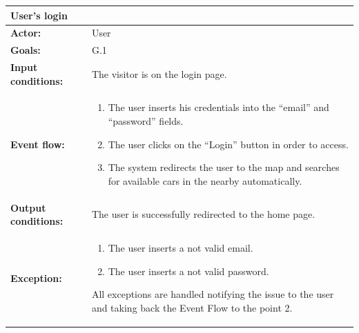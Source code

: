 \begin{tabular} { p{5cm} p{8cm} } 
\textbf{User's login} & \\
\hline
\textbf{Actor:} & User \\ 
\textbf{Goals:} & G.1 \\ 
\textbf{Input conditions:} & The visitor is on the login page. \\
\textbf{Event flow:} & \begin{enumerate}
				\item
				The user inserts his credentials into the “email” and “password” fields.
				\item
				The user clicks on the “Login” button in order to access.
				\item
				The system redirects the user to the map and searches for available cars in the nearby automatically.
			\end{enumerate} \\ 
\textbf{Output conditions:} & The user is successfully redirected to the
home page.\\ 
\textbf{Exception:} & \begin{enumerate}
				\item
				The user inserts a not valid email.
				\item
				The user inserts a not valid password.
			\end{enumerate}
All exceptions are handled notifying the issue to the user and taking back the Event Flow to the point 2. \\
\hline
\end{tabular}


